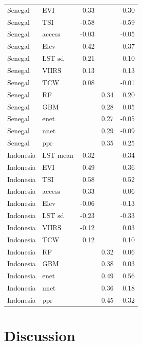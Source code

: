 \documentclass[review]{elsarticle}
\begin{document}
\begin{table}
\begin{tabular}{ll|rrr}
Senegal & EVI &  0.33&  & 0.30\\
Senegal & TSI &  -0.58&  &  -0.59\\
Senegal & access & -0.03 &  &  -0.05\\
Senegal & Elev &  0.42&  &0.37\\ 
Senegal & LST sd &  0.21&  & 0.10 \\
Senegal & VIIRS &  0.13&  &  0.13\\
Senegal & TCW & 0.08 &  &-0.01\\ 
Senegal & RF &  & 0.34 &  0.20\\
Senegal & GBM &  &  0.28& 0.05\\
Senegal & enet &  &  0.27&  -0.05\\
Senegal & nnet &  & 0.29 &-0.09 \\
Senegal & ppr &  &  0.35& 0.25\vspace{0.2cm}\\
Indonesia & LST mean & -0.32 &  &-0.34\\
Indonesia & EVI &  0.49&  & 0.36\\
Indonesia & TSI &  0.58&  &0.52\\
Indonesia & access &0.33 &  & 0.06 \\
Indonesia & Elev& -0.06&  &-0.13\\ 
Indonesia & LST sd & -0.23 &  & -0.33\\
Indonesia & VIIRS &  -0.12&  & 0.03\\
Indonesia & TCW& 0.12 &  &0.10\\ 
Indonesia & RF &  & 0.32 & 0.06\\
Indonesia & GBM &  &  0.38&0.03\\
Indonesia & enet &  &  0.49&  0.56\\
Indonesia & nnet &  &  0.36&  0.18\\
Indonesia & ppr &  &  0.45& 0.32\\



\end{tabular}
\label{t:mlresults2}
\end{table}



\section{Discussion}
\end{document}
